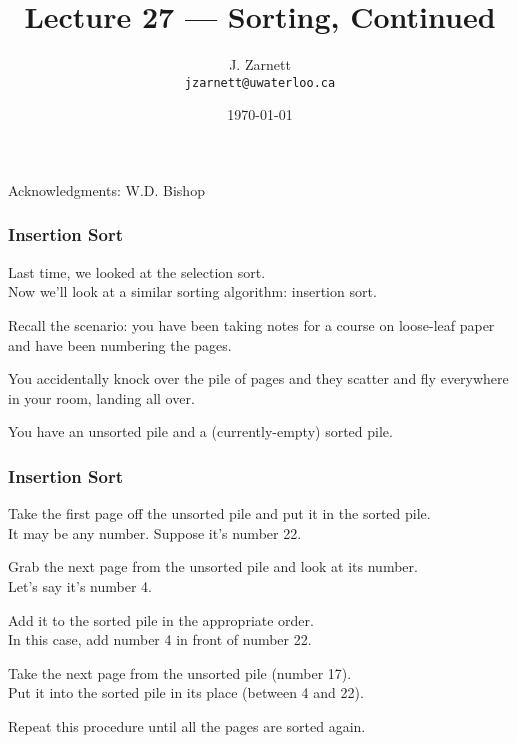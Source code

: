 

\title{Lecture 27 --- Sorting, Continued }

\author{J. Zarnett\\
\texttt{jzarnett@uwaterloo.ca}}
\date{\today}



\begin{frame}
  \titlepage
  
  \begin{center}
  \small{Acknowledgments: W.D. Bishop}
  \end{center}
\end{frame}

\begin{frame}
\frametitle{Insertion Sort}
Last time, we looked at the selection sort.\\
\quad Now we'll look at a similar sorting algorithm: insertion sort.

Recall the scenario: you have been taking notes for a course on loose-leaf paper and have been numbering the pages.

You accidentally knock over the pile of pages and they scatter and fly everywhere in your room, landing all over.

You have an unsorted pile and a (currently-empty) sorted pile.

\end{frame}


\begin{frame}
\frametitle{Insertion Sort}

Take the first page off the unsorted pile and put it in the sorted pile.\\
\quad It may be any number. Suppose it's number 22.

Grab the next page from the unsorted pile and look at its number.\\
\quad Let's say it's number 4.

Add it to the sorted pile in the appropriate order.\\
\quad In this case, add number 4 in front of number 22.

Take the next page from the unsorted pile (number 17).\\
\quad Put it into the sorted pile in its place (between 4 and 22).

Repeat this procedure until all the pages are sorted again.

\end{frame}

